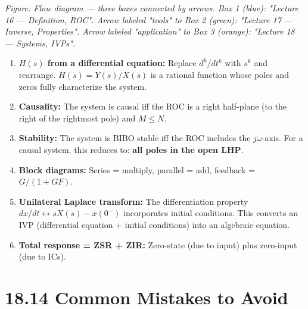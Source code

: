 \documentclass[11pt]{article}
\begin{document}
\textit{Figure: Flow diagram — three boxes connected by arrows. Box 1 (blue): "Lecture 16 — Definition, ROC". Arrow labeled "tools" to Box 2 (green): "Lecture 17 — Inverse, Properties". Arrow labeled "application" to Box 3 (orange): "Lecture 18 — Systems, IVPs".}

\begin{enumerate}
  \item \textbf{$H(s)$ from a differential equation:} Replace $d^k/dt^k$ with $s^k$ and rearrange. $H(s) = Y(s)/X(s)$ is a rational function whose poles and zeros fully characterize the system.
  \item \textbf{Causality:} The system is causal iff the ROC is a right half-plane (to the right of the rightmost pole) and $M \leq N$.
  \item \textbf{Stability:} The system is BIBO stable iff the ROC includes the $j\omega$-axis. For a causal system, this reduces to: \textbf{all poles in the open LHP}.
  \item \textbf{Block diagrams:} Series = multiply, parallel = add, feedback = $G/(1 + GF)$.
  \item \textbf{Unilateral Laplace transform:} The differentiation property $dx/dt \leftrightarrow sX(s) - x(0^-)$ incorporates initial conditions. This converts an IVP (differential equation + initial conditions) into an algebraic equation.
  \item \textbf{Total response = ZSR + ZIR:} Zero-state (due to input) plus zero-input (due to ICs).
\end{enumerate}

\section*{18.14 Common Mistakes to Avoid}
\end{document}
